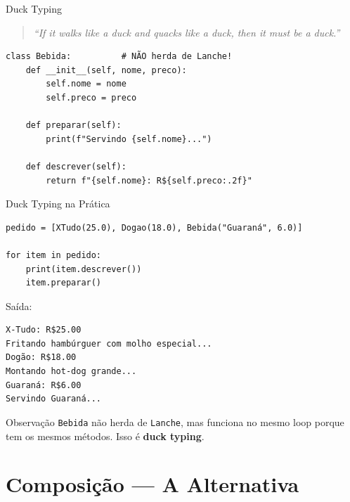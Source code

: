 \documentclass[aspectratio=169]{beamer}
\begin{document}
\begin{frame}[fragile]{Duck Typing}
  \begin{quote}
    \emph{``If it walks like a duck and quacks like a duck, then it must be a duck.''}
  \end{quote}

  \bigskip

  \begin{lstlisting}
class Bebida:          # NÃO herda de Lanche!
    def __init__(self, nome, preco):
        self.nome = nome
        self.preco = preco

    def preparar(self):
        print(f"Servindo {self.nome}...")

    def descrever(self):
        return f"{self.nome}: R${self.preco:.2f}"
  \end{lstlisting}
\end{frame}

\begin{frame}{Duck Typing na Prática}
  \begin{lstlisting}
pedido = [XTudo(25.0), Dogao(18.0), Bebida("Guaraná", 6.0)]

for item in pedido:
    print(item.descrever())
    item.preparar()
  \end{lstlisting}

  Saída:
  \begin{lstlisting}[numbers=none]
X-Tudo: R$25.00
Fritando hambúrguer com molho especial...
Dogão: R$18.00
Montando hot-dog grande...
Guaraná: R$6.00
Servindo Guaraná...
  \end{lstlisting}

  \begin{alertblock}{Observação}
    \texttt{Bebida} não herda de \texttt{Lanche}, mas funciona no mesmo loop porque tem os mesmos métodos. Isso é \textbf{duck typing}.
  \end{alertblock}
\end{frame}

\section{Composição — A Alternativa}
\end{document}
